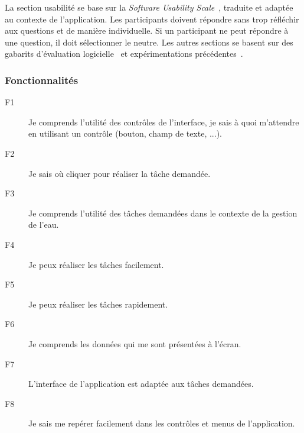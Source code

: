 \documentclass[a4paper, 11pt]{article}
\begin{document}
        La section usabilité se base sur la \emph{Software Usability Scale}~\cite{sus, usagov}, traduite et adaptée au contexte de l'application. Les participants doivent répondre sans trop réfléchir aux questions et de manière individuelle. Si un participant ne peut répondre à une question, il doit sélectionner le neutre. Les autres sections se basent sur des gabarits d'évaluation logicielle~\cite{ssi} et expérimentations précédentes~\cite{richardbastin}.


        \subsubsection*{Fonctionnalités}
            \begin{description}
                \item[F1] Je comprends l'utilité des contrôles de l'interface, je sais à quoi m'attendre en utilisant un contrôle (bouton, champ de texte, ...).
                \item[F2] Je sais où cliquer pour réaliser la tâche demandée.
                \item[F3] Je comprends l'utilité des tâches demandées dans le contexte de la gestion de l'eau.
                \item[F4] Je peux réaliser les tâches facilement.
                \item[F5] Je peux réaliser les tâches rapidement.
                \item[F6] Je comprends les données qui me sont présentées à l'écran.
                \item[F7] L'interface de l'application est adaptée aux tâches demandées.
                \item[F8] Je sais me repérer facilement dans les contrôles et menus de l'application.
            \end{description}
\end{document}
